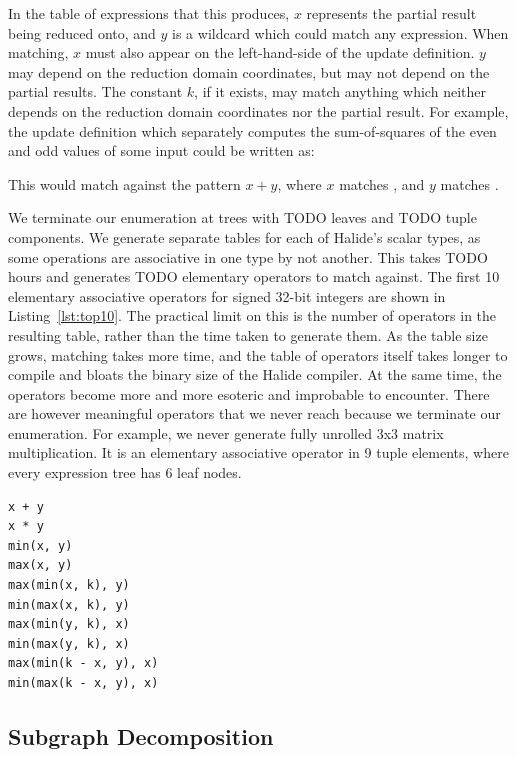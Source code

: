 In the table of expressions that this produces, $x$ represents the partial result being reduced onto, and $y$ is a wildcard which could match any expression. When matching, $x$ must also appear on the left-hand-side of the update definition. $y$ may depend on the reduction domain coordinates, but may not depend on the partial results. The constant $k$, if it exists, may match anything which neither depends on the reduction domain coordinates nor the partial result. For example, the update definition which separately computes the sum-of-squares of the even and odd values of some input  could be written as:


This would match against the pattern $x + y$, where $x$ matches , and $y$ matches .

We terminate our enumeration at trees with TODO leaves and TODO tuple components. We generate separate tables for each of Halide's scalar types, as some operations are associative in one type by not another. This takes TODO hours and generates TODO elementary operators to match against. The first 10 elementary associative operators for signed 32-bit integers are shown in Listing~\ref{lst:top10}. The practical limit on this is the number of operators in the resulting table, rather than the time taken to generate them. As the table size grows, matching takes more time, and the table of operators itself takes longer to compile and bloats the binary size of the Halide compiler. At the same time, the operators become more and more esoteric and improbable to encounter. There are however meaningful operators that we never reach because we terminate our enumeration. For example, we never generate fully unrolled 3x3 matrix multiplication. It is an elementary associative operator in 9 tuple elements, where every expression tree has 6 leaf nodes.

\begin{lstlisting}[caption={The first 10 elementary associative operators for 32-bit signed integers}, label={lst:top10}]
x + y
x * y
min(x, y) 
max(x, y) 
max(min(x, k), y) 
min(max(x, k), y) 
max(min(y, k), x) 
min(max(y, k), x) 
max(min(k - x, y), x) 
min(max(k - x, y), x) 
\end{lstlisting}


\subsection{Subgraph Decomposition}
\label{subsec:decomposition}

